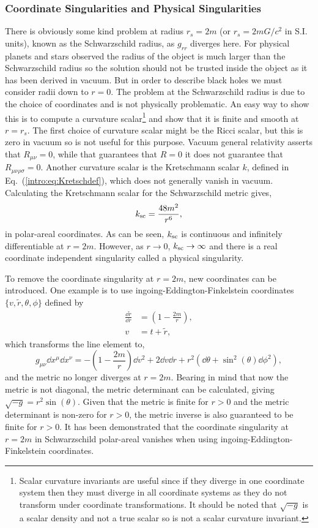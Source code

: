 \subsubsection{Coordinate Singularities and Physical Singularities}
There is obviously some kind problem at radius $r_s=2m$ (or $r_s=2mG/c^2$ in S.I. units), known as the Schwarzschild radius, as $g_{rr}$ diverges here. For physical planets and stars observed the radius of the object is much larger than the Schwarzschild radius so the solution should not be trusted inside the object as it has been derived in vacuum. But in order to describe black holes we must consider radii down to $r=0$. The problem at the Schwarzschild radius is due to the choice of coordinates and is not physically problematic. An easy way to show this is to compute a curvature scalar\footnote{Scalar curvature invariants are useful since if they diverge in one coordinate system then they must diverge in all coordinate systems as they do not transform under coordinate transformations. It should be noted that $\sqrt{-g}$ is a scalar density and not a true scalar so is not a scalar curvature invariant.} and show that it is finite and smooth at $r=r_s$. The first choice of curvature scalar might be the Ricci scalar, but this is zero in vacuum so is not useful for this purpose. Vacuum general relativity asserts that $R_{\mu\nu}=0$, while that guarantees that $R=0$ it does not guarantee that $R_{\mu\nu\rho\sigma}=0$. Another curvature scalar is the Kretschmann scalar $k$, defined in Eq.~(\ref{intro:eq:Kretschdef}), which does not generally vanish in vacuum. Calculating the Kretschmann scalar for the Schwarzschild metric gives,
\begin{equation}
k_{\rm sc} = \frac{48 m^2}{r^6}, \label{intro:eq:Kretsch}
\end{equation} 
in polar-areal coordinates. As can be seen, $k_{\rm sc}$ is continuous and infinitely differentiable at $r=2m$. However, as $r\rightarrow0$, $k_{\rm sc}\rightarrow \infty$ and there is a real coordinate independent singularity called a physical singularity. 

To remove the coordinate singularity at $r=2m$, new coordinates can be introduced. One example is to use ingoing-Eddington-Finkelstein coordinates $\{ v,\tilde{r},\theta,\phi \}$ defined by
\begin{align}
\frac{\dd \tilde{r}}{\dd r} &= \left(1-\frac{2m}{r}\right), \\
v &= t + \tilde{r},
\end{align} 
which transforms the line element to, 
\begin{equation}
g_{\mu\nu}\dd x^\mu \dd x^\nu = -\left( 1-\frac{2m}{r}\right) \dd v^2 + 2 \dd v \dd r + r^2 \left(\dd \theta + \sin^2(\theta) \dd \phi^2\right),
\end{equation}
and the metric no longer diverges at $r=2m$. Bearing in mind that now the metric is not diagonal, the metric determinant can be calculated, giving $\sqrt{-g} = r^2 \sin(\theta)$. Given that the metric is finite for $r>0$ and the metric determinant is non-zero for $r>0$, the metric inverse is also guaranteed to be finite for $r>0$. It has been demonstrated that the coordinate singularity at $r=2m$ in Schwarzschild polar-areal vanishes when using ingoing-Eddington-Finkelstein coordinates.

